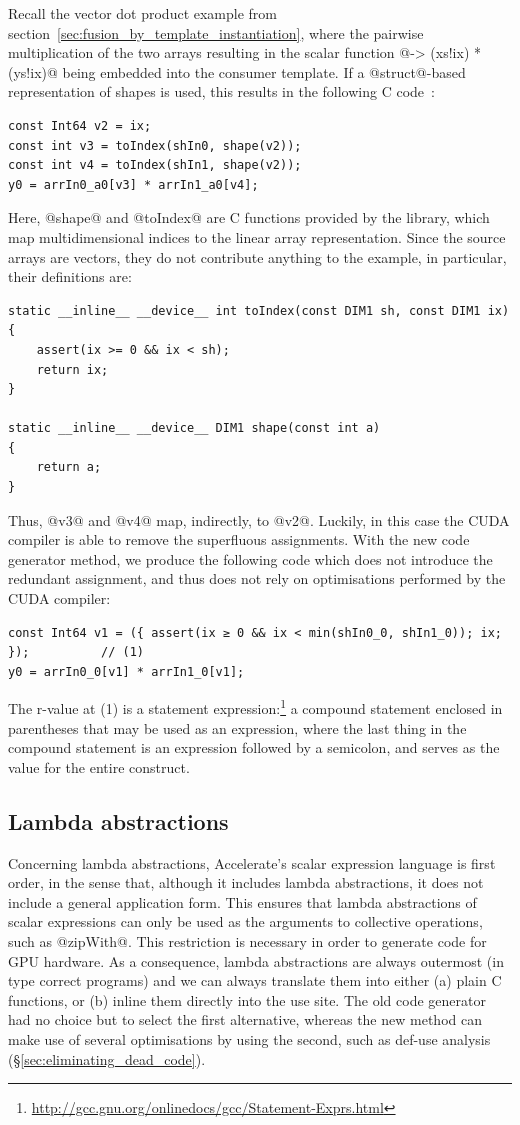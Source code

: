 Recall the vector dot product example from
section~\ref{sec:fusion_by_template_instantiation}, where the pairwise
multiplication of the two arrays resulting in the scalar function
@\ix -> (xs!ix) * (ys!ix)@ being embedded into the consumer template. If a
@struct@-based representation of shapes is used, this results in the following
C code~\cite{CliftonEverest:2014vi}:
%
\begin{lstlisting}[style=cuda]
const Int64 v2 = ix;
const int v3 = toIndex(shIn0, shape(v2));
const int v4 = toIndex(shIn1, shape(v2));
y0 = arrIn0_a0[v3] * arrIn1_a0[v4];
\end{lstlisting}
%
Here, @shape@ and @toIndex@ are C functions provided by the library, which map
multidimensional indices to the linear array representation. Since the source
arrays are vectors, they do not contribute anything to the example, in
particular, their definitions are:
%
\begin{lstlisting}[style=cuda]
static __inline__ __device__ int toIndex(const DIM1 sh, const DIM1 ix)
{
    assert(ix >= 0 && ix < sh);
    return ix;
}

static __inline__ __device__ DIM1 shape(const int a)
{
    return a;
}
\end{lstlisting}
%
Thus, @v3@ and @v4@ map, indirectly, to @v2@. Luckily, in this case the CUDA
compiler is able to remove the superfluous assignments. With the new code
generator method, we produce the following code which does not introduce the
redundant assignment, and thus does not rely on optimisations performed by the
CUDA compiler:
%
\begin{lstlisting}[style=cuda]
const Int64 v1 = ({ assert(ix ≥ 0 && ix < min(shIn0_0, shIn1_0)); ix; });          // (1)
y0 = arrIn0_0[v1] * arrIn1_0[v1];
\end{lstlisting}
%
The r-value at (1) is a statement
expression:\footnote{\url{http://gcc.gnu.org/onlinedocs/gcc/Statement-Exprs.html}}
a compound statement enclosed in parentheses that may be used as an expression,
where the last thing in the compound statement is an expression followed by a
semicolon, and serves as the value for the entire construct.


\subsection{Lambda abstractions}

Concerning lambda abstractions, Accelerate's scalar
expression language is first order, in the sense that, although it includes
lambda abstractions, it does not include a general application form. This
ensures that lambda abstractions of scalar expressions can only be used as the
arguments to collective operations, such as @zipWith@. This restriction is
necessary in order to generate code for GPU hardware. As a consequence, lambda
abstractions are always outermost (in type correct programs) and we can always
translate them into either (a) plain C functions, or (b) inline them directly
into the use site. The old code generator had no choice but to select the first
alternative, whereas the new method can make use of several optimisations by
using the second, such as def-use analysis (\S\ref{sec:eliminating_dead_code}).

